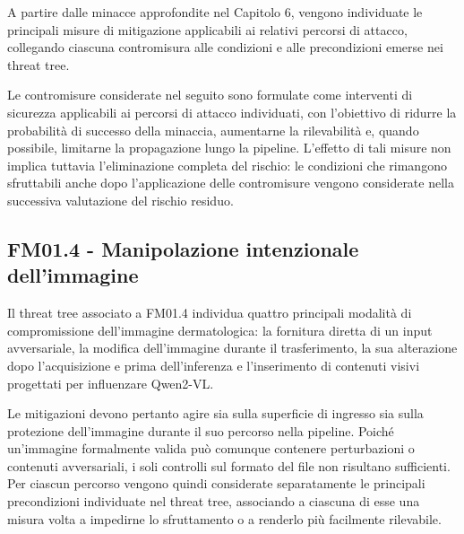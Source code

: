 A partire dalle minacce approfondite nel Capitolo 6, vengono individuate le principali misure di mitigazione applicabili ai relativi percorsi di attacco, collegando ciascuna contromisura alle condizioni e alle precondizioni emerse nei threat tree.

Le contromisure considerate nel seguito sono formulate come interventi di sicurezza applicabili ai percorsi di attacco individuati, con l'obiettivo di ridurre la probabilità di successo della minaccia, aumentarne la rilevabilità e, quando possibile, limitarne la propagazione lungo la pipeline. L'effetto di tali misure non implica tuttavia l'eliminazione completa del rischio: le condizioni che rimangono sfruttabili anche dopo l'applicazione delle contromisure vengono considerate nella successiva valutazione del rischio residuo.

\subsection{FM01.4 - Manipolazione intenzionale dell'immagine}
Il threat tree associato a FM01.4 individua quattro principali modalità di compromissione dell'immagine dermatologica: la fornitura diretta di un input avversariale, la modifica dell'immagine durante il trasferimento, la sua alterazione dopo l'acquisizione e prima dell'inferenza e l'inserimento di
contenuti visivi progettati per influenzare Qwen2-VL. 

Le mitigazioni devono pertanto agire sia sulla superficie di ingresso sia sulla protezione dell'immagine durante il suo percorso nella pipeline. Poiché un'immagine formalmente valida può comunque contenere perturbazioni o contenuti avversariali, i soli controlli sul formato del file non risultano sufficienti.
Per ciascun percorso vengono quindi considerate separatamente le principali precondizioni individuate nel threat tree, associando a ciascuna di esse una misura volta a impedirne lo sfruttamento o a renderlo più facilmente rilevabile.

